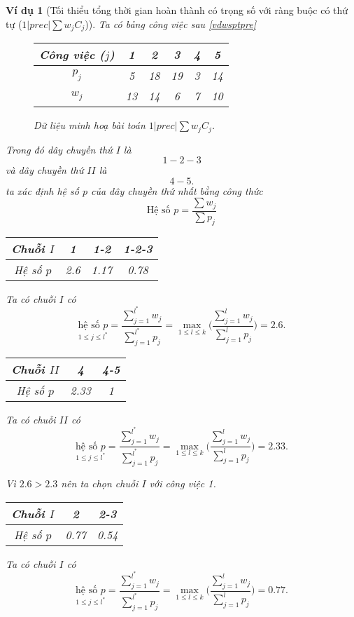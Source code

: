 \documentclass[12pt,a4paper]{report}
\newtheorem{vd}{Ví dụ}
\begin{document}
\begin{vd}[Tối thiểu tổng thời gian hoàn thành có trọng số với ràng buộc có thứ tự ($1 | prec | \sum w_j C_j$)]
Ta có bảng công việc sau \eqref{vdwsptpre}

\begin{figure}[h!]
	\centering
	\begin{tabular}{|c | c c c | c c |} 
	\hline
	Công việc ($j$) & 1 & 2 & 3 & 4 & 5 \\
	\hline\hline
	$p_j$ & 5 & 18 & 19 & 3 & 14 \\
	$w_j$ & 13 & 14 & 6 & 7 & 10 \\
	\hline
	\end{tabular}
\caption{\label{vdwsptpre} Dữ liệu minh hoạ bài toán $1 | prec | \sum w_j C_j$.}
\end{figure}

Trong đó dây chuyền thứ $I$ là $$1-2-3$$ và dây chuyền thứ $II$ là $$4-5.$$
ta xác định hệ số $p$ của dây chuyền thứ nhất bằng công thức $$\text{Hệ số }p=\frac{\sum w_j}{\sum p_j}$$

\begin{table}[h!]
	\centering
	\begin{tabular}{|c | c c c |} 
	\hline
	Chuỗi $I$ & 1 & 1-2 & 1-2-3 \\
	\hline\hline
	Hệ số $p$ & 2.6 & 1.17 & 0.78 \\
	\hline
	\end{tabular}
\end{table}
Ta có chuỗi $I$ có $$
	\underset{1 \leq j \leq l^*}{\text{hệ số }p}= \frac{\sum_{j=1}^{l^*}w_j}{\sum_{j=1}^{l^*}p_j} = \underset{1 \leq l \leq k}{\max}\Biggl(\frac{\sum_{j=1}^{l}w_j}{\sum_{j=1}^{l}p_j}\Biggl)=2.6.$$

\begin{table}[h!]
	\centering
	\begin{tabular}{|c | c c |} 
	\hline
	Chuỗi $II$ & 4 & 4-5 \\
	\hline\hline
	Hệ số $p$ & 2.33 & 1 \\
	\hline
	\end{tabular}
\end{table}
Ta có chuỗi $II$ có $$
	\underset{1 \leq j \leq l^*}{\text{hệ số }p}= \frac{\sum_{j=1}^{l^*}w_j}{\sum_{j=1}^{l^*}p_j} = \underset{1 \leq l \leq k}{\max}\Biggl(\frac{\sum_{j=1}^{l}w_j}{\sum_{j=1}^{l}p_j}\Biggl)=2.33.$$

Vì $2.6>2.3$ nên ta chọn chuỗi $I$ với công việc 1.

\begin{table}[h!]
	\centering
	\begin{tabular}{|c | c c |} 
	\hline
	Chuỗi $I$ & 2 & 2-3 \\
	\hline\hline
	Hệ số $p$ & 0.77 & 0.54 \\
	\hline
	\end{tabular}
\end{table}
Ta có chuỗi $I$ có $$
	\underset{1 \leq j \leq l^*}{\text{hệ số }p}= \frac{\sum_{j=1}^{l^*}w_j}{\sum_{j=1}^{l^*}p_j} = \underset{1 \leq l \leq k}{\max}\Biggl(\frac{\sum_{j=1}^{l}w_j}{\sum_{j=1}^{l}p_j}\Biggl)=0.77.$$


\end{vd}
\end{document}
